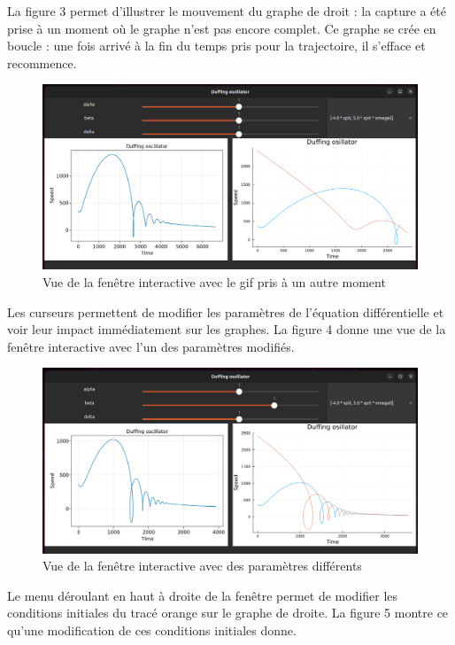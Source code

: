 \documentclass[a4paper, french, 12pt, titlepage]{article}
\begin{document}
La figure 3 permet d'illustrer le mouvement du graphe de droit : la capture a été prise à un moment où le graphe n'est pas encore complet. Ce graphe se crée en boucle : une fois arrivé à la fin du temps pris pour la trajectoire, il s'efface et recommence. \\

\begin{figure}[htb]
  \includegraphics[width=\linewidth]{interactivewindow_2.png}
  \caption{Vue de la fenêtre interactive avec le gif pris à un autre moment}
  \label{fig:organigramme}
\end{figure}

Les curseurs permettent de modifier les paramètres de l'équation différentielle et voir leur impact immédiatement sur les graphes. La figure 4 donne une vue de la fenêtre interactive avec l'un des paramètres modifiés. \\

\begin{figure}[htb]
  \includegraphics[width=\linewidth]{interactivewindow_3.png}
  \caption{Vue de la fenêtre interactive avec des paramètres différents}
  \label{fig:organigramme}
\end{figure}

Le menu déroulant en haut à droite de la fenêtre permet de modifier les conditions initiales du tracé orange sur le graphe de droite. La figure 5 montre ce qu'une modification de ces conditions initiales donne. \\
\end{document}
